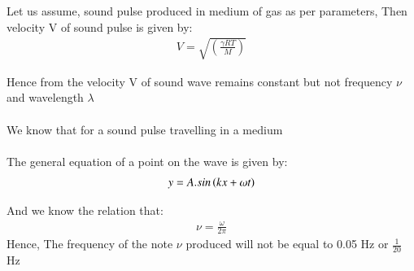 \documentclass[beamer]{IEEEtran}
\theoremstyle{remark}
\begin{document}
 Let us assume, sound pulse produced in medium of gas as per parameters,
Then velocity V of sound pulse is given by:\\
\begin{align}
    \label{a1}
    V=\sqrt{\left(\frac{\gamma RT}{M}\right)}
\end{align}

Hence from \brak{\ref{a1}} the velocity V of sound wave remains constant but not frequency $\nu$ and wavelength $\lambda$\\\\
 We know that for a sound pulse travelling in a medium\\\\
The general equation of a point on the wave is given by:\\
\begin{align}
    \label{a2}
     y=A.sin\left(kx+\omega t\right)
\end{align}

And we know the relation that:
\begin{align}
    \label{a3}
    \nu = \frac{\omega}{2\pi}
\end{align}
Hence, The frequency of the note $\nu$ produced will not be equal to 0.05 Hz or $\frac{1}{20}$ Hz 
\end{document}
